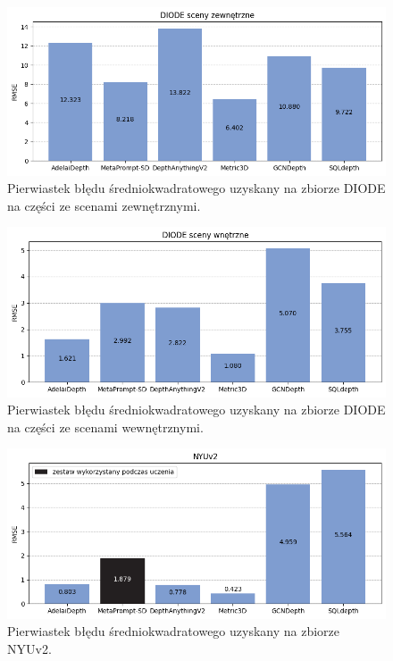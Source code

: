 \begin{figure}[H]
    \centering
    \includegraphics{plots/rmse/0}
    \caption{Pierwiastek błędu średniokwadratowego uzyskany na zbiorze DIODE na części ze scenami zewnętrznymi.}
    \label{fig:rmse_0}
\end{figure}
\begin{figure}[H]
    \centering
    \includegraphics{plots/rmse/1}
    \caption{Pierwiastek błędu średniokwadratowego uzyskany na zbiorze DIODE na części ze scenami wewnętrznymi.}
    \label{fig:rmse_1}
\end{figure}
\begin{figure}[H]
    \centering
    \includegraphics{plots/rmse/2}
    \caption{Pierwiastek błędu średniokwadratowego uzyskany na zbiorze NYUv2.}
    \label{fig:rmse_2}
\end{figure}

